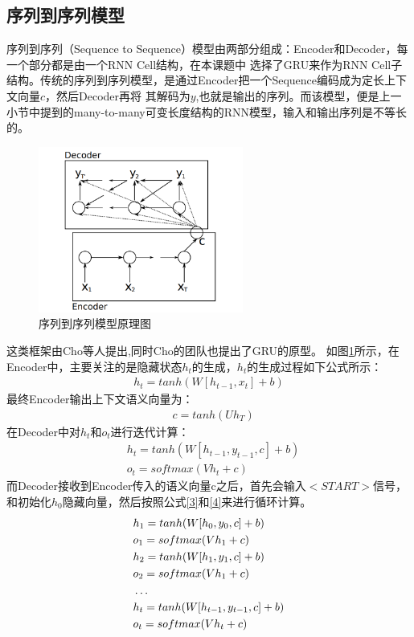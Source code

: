 \documentclass[supercite]{HustGraduPaper}
\theoremstyle{definition}
\begin{document}
\subsection{序列到序列模型}
序列到序列（Sequence to Sequence）模型由两部分组成：Encoder和Decoder，每一个部分都是由一个RNN Cell结构，在本课题中
选择了GRU来作为RNN Cell子结构。传统的序列到序列模型，是通过Encoder把一个Sequence编码成为定长上下文向量$c$，然后Decoder再将
其解码为$y$,也就是输出的序列。而该模型，便是上一小节中提到的many-to-many可变长度结构的RNN模型，输入和输出序列是不等长的。
\begin{figure}[htbp] %
  \centering %
  \includegraphics[width=0.6\textwidth]{images/seq2seq.png} %
  \caption{序列到序列模型原理图} %
  \label{Fig.seq2seq} %
\end{figure}
这类框架由Cho\cite{cho2014learning}等人提出,同时Cho的团队也提出了GRU的原型。
如图\ref{Fig.seq2seq}所示，在Encoder中，主要关注的是隐藏状态$h_t$的生成，$h_t$的生成过程如下公式所示：
\begin{align}
  h_t = tanh(W[h_{t-1},x_t] + b) \label{1}
\end{align}
最终Encoder输出上下文语义向量为：
\begin{align}
  &c = tanh(Uh_T) \label{2}
\end{align}
在Decoder中对$h_t$和$o_t$进行迭代计算：
\begin{align}
  &h_t = tanh(W[h_{t-1},y_{t-1},c] + b) \label{3}\\
  &o_t = softmax(Vh_t + c) \label{4}
\end{align}
而Decoder接收到Encoder传入的语义向量c之后，首先会输入$<START>$信号，和初始化$h_0$隐藏向量，然后按照公式\ref{3}和\ref{4}来进行循环计算。
\begin{align}
  &h_1 = tanh(W[h_0,y_0,c] + b)\notag\\
  &o_1 = softmax(Vh_1 + c)\notag\\
  &h_2 = tanh(W[h_1,y_1,c] + b)\notag\\
  &o_2 = softmax(Vh_1 + c)\notag\\
  &\dots\notag\\
  &h_t = tanh(W[h_{t-1},y_{t-1},c] + b)\notag\\
  &o_t = softmax(Vh_t + c)\notag
\end{align}
\end{document}
